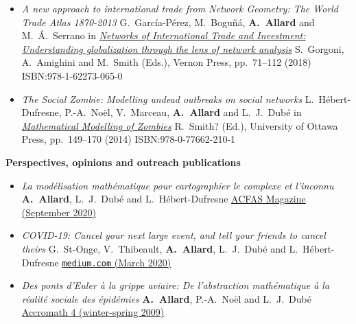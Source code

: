 \documentclass[11pt]{article}
\begin{document}
%
\begin{itemize}[itemsep=0.5em]
%
  \item \textit{A new approach to international trade from Network Geometry: The World Trade Atlas 1870-2013}\split
  G.~Garc\'ia-P\'erez, M.~Bogu\~n\'a, \textbf{A.~Allard} and M.~\'A.~Serrano\split
  in \href{https://vernonpress.com/book/96}{\textit{Networks of International Trade and Investment: Understanding globalization through the lens of network analysis}}\split
  S.~Gorgoni, A.~Amighini and M.~Smith (Eds.), Vernon Press, pp.~71--112 (2018) ISBN:978-1-62273-065-0
%
  \item \textit{The Social Zombie: Modelling undead outbreaks on social networks}\split
  L.~H\'ebert-Dufresne, P.-A.~No\"el, V.~Marceau, \textbf{A.~Allard} and L.~J.~Dub\'e\split
  in \href{http://www.press.uottawa.ca/mathematical-modelling-of-zombies}{\textit{Mathematical Modelling of Zombies}}\split
  R.~Smith$\!$? (Ed.), University of Ottawa Press, pp.~149--170 (2014) ISBN:978-0-77662-210-1
%
\end{itemize}
%
%
%
\textbf{Perspectives, opinions and outreach publications}
%
\begin{itemize}[itemsep=0.5em]
%
  \item \textit{La modélisation mathématique pour cartographier le complexe et l’inconnu}\footnotemark\split
  \textbf{A.~Allard}, L.~J.~Dub\'e and L.~H\'ebert-Dufresne\split
  \href{https://www.acfas.ca/publications/magazine/2019/09/modelisation-mathematique-cartographier-complexe-inconnu}{ACFAS Magazine (September 2020)}
%
%
  \item \textit{COVID-19: Cancel your next large event, and tell your friends to cancel theirs}\split
  G.~St-Onge, V.~Thibeault, \textbf{A.~Allard}, L.~J.~Dub\'e and L.~H\'ebert-Dufresne\split
  \href{https://medium.com/@antoine.allard/covid-19-cancel-your-next-large-event-and-tell-your-friends-to-cancel-theirs-7c06e688474e}{\texttt{medium.com} (March 2020)}
%
  \item \textit{Des ponts d'Euler \`a la grippe aviaire: De l'abstraction math\'ematique \`a la r\'ealit\'e sociale des \'epid\'emies}\footnotemark\split
  \textbf{A.~Allard}, P.-A.~No\"el and L.~J.~Dub\'e\split
  \href{https://accromath.uqam.ca/2009/02/des-ponts-deuler-a-la-grippe-aviaire/}{Accromath 4 (winter-spring 2009)}
%
%
\end{itemize}
\end{document}
